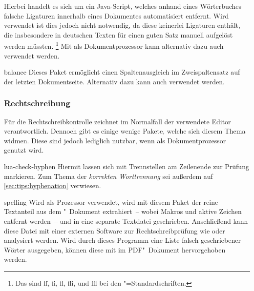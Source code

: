 \begin{packages}
  Hierbei handelt es sich um ein Java-Script, welches anhand eines Wörterbuches 
  falsche Ligaturen innerhalb eines Dokumentes automatisiert entfernt. Wird 
  \Univers verwendet ist dies jedoch nicht notwendig, da diese keinerlei 
  Ligaturen enthält, die insbesondere in deutschen Texten für einen guten Satz 
  manuell aufgelöst werden müssten.%
  \footnote{%
    Das sind ff, fi, fl, ffi, und ffl bei den "=Standardschriften.
  }
  Mit  als Dokumentprozessor kann alternativ dazu auch 
   verwendet werden.
\item[balance]
  Dieses Paket ermöglicht einen Spaltenausgleich im Zweispaltensatz auf der 
  letzten Dokumentseite. Alternativ dazu kann auch  verwendet 
  werden.
\end{packages}

\subsubsection{Rechtschreibung}
Für die Rechtschreibkontrolle zeichnet im Normalfall der verwendete Editor 
verantwortlich. Dennoch gibt es einige wenige Pakete, welche sich diesem Thema 
widmen. Diese sind jedoch lediglich nutzbar, wenn  als 
Dokumentprozessor genutzt wird.
\begin{packages}
\item[lua-check-hyphen]
  Hiermit lassen sich mit  Trennstellen am Zeilenende zur 
  Prüfung markieren. Zum Thema der \textit{korrekten Worttrennung} sei außerdem 
  auf \autoref{sec:tips:hyphenation} verwiesen.
\item[spelling]
  Wird  als Prozessor verwendet, wird mit diesem Paket der 
  reine Textanteil aus dem "~Dokument extrahiert~-- wobei Makros 
  und aktive Zeichen entfernt werden~-- und in eine separate Textdatei 
  geschrieben. Anschließend kann diese Datei mit einer externen Software zur 
  Rechtschreibprüfung wie  oder  
  analysiert werden. Wird durch dieses Programm eine Liste falsch geschriebener 
  Wörter ausgegeben, können diese mit  im PDF"~Dokument 
  hervorgehoben werden.
\end{packages}

